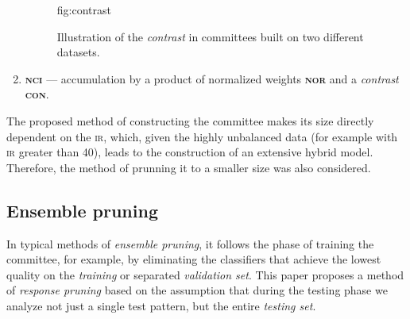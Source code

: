 \documentclass[pmlr]{jmlr}
\begin{document}
\begin{enumerate}
\begin{figure}[!h]
\floatconts
  {fig:contrast}
  {\caption{Illustration of the \emph{contrast} in committees built on two different datasets.}}
  {%
  }
\end{figure}

	
	\item \textbf{\textsc{nci}} --- accumulation by a product of normalized weights \textbf{\textsc{nor}} and a \emph{contrast} \textbf{\textsc{con}}.
\end{enumerate}

The proposed method of constructing the committee makes its size directly dependent on the \textsc{ir}, which, given the highly unbalanced data (for example with \textsc{ir} greater than 40), leads to the construction of an extensive hybrid model. Therefore, the method of prunning it to a smaller size was also considered.

\subsection{Ensemble pruning}

In typical methods of \emph{ensemble pruning}, it follows the phase of training the committee, for example, by eliminating the classifiers that achieve the lowest quality on the \emph{training} or separated \emph{validation set}. This paper proposes a method of \emph{response pruning} based on the assumption that during the testing phase we analyze not just a single test pattern, but the entire \emph{testing set}.
\end{document}
